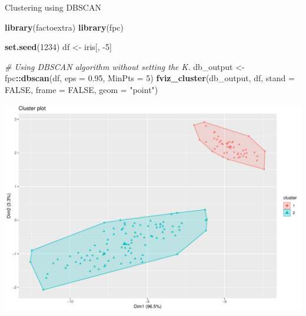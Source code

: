 \documentclass[12pt,ignorenonframetext,]{beamer}
\newenvironment{Shaded}{\begin{snugshade}}{\end{snugshade}}
\newcommand{\CommentTok}[1]{\textcolor[rgb]{0.56,0.35,0.01}{\textit{#1}}}
\newcommand{\DataTypeTok}[1]{\textcolor[rgb]{0.13,0.29,0.53}{#1}}
\newcommand{\DecValTok}[1]{\textcolor[rgb]{0.00,0.00,0.81}{#1}}
\newcommand{\FloatTok}[1]{\textcolor[rgb]{0.00,0.00,0.81}{#1}}
\newcommand{\KeywordTok}[1]{\textcolor[rgb]{0.13,0.29,0.53}{\textbf{#1}}}
\newcommand{\NormalTok}[1]{#1}
\newcommand{\OperatorTok}[1]{\textcolor[rgb]{0.81,0.36,0.00}{\textbf{#1}}}
\newcommand{\OtherTok}[1]{\textcolor[rgb]{0.56,0.35,0.01}{#1}}
\newcommand{\StringTok}[1]{\textcolor[rgb]{0.31,0.60,0.02}{#1}}
\begin{document}
\begin{frame}[fragile]{Clustering using DBSCAN}
\protect\hypertarget{clustering-using-dbscan}{}

\tiny

\begin{Shaded}
\begin{Highlighting}[]
\KeywordTok{library}\NormalTok{(factoextra)}
\KeywordTok{library}\NormalTok{(fpc)}

\KeywordTok{set.seed}\NormalTok{(}\DecValTok{1234}\NormalTok{)}
\NormalTok{df <-}\StringTok{ }\NormalTok{iris[, }\DecValTok{-5}\NormalTok{]}

\CommentTok{# Using DBSCAN algorithm without setting the K.}
\NormalTok{db_output <-}\StringTok{ }\NormalTok{fpc}\OperatorTok{::}\KeywordTok{dbscan}\NormalTok{(df, }\DataTypeTok{eps =} \FloatTok{0.95}\NormalTok{, }\DataTypeTok{MinPts =} \DecValTok{5}\NormalTok{)}
\KeywordTok{fviz_cluster}\NormalTok{(db_output, df, }\DataTypeTok{stand =} \OtherTok{FALSE}\NormalTok{, }\DataTypeTok{frame =} \OtherTok{FALSE}\NormalTok{, }\DataTypeTok{geom =} \StringTok{"point"}\NormalTok{)}
\end{Highlighting}
\end{Shaded}

\begin{center}\includegraphics[width=0.7\linewidth,height=0.6\textheight]{figs/unnamed-chunk-18} \end{center}

\normalsize

\end{frame}
\end{document}

